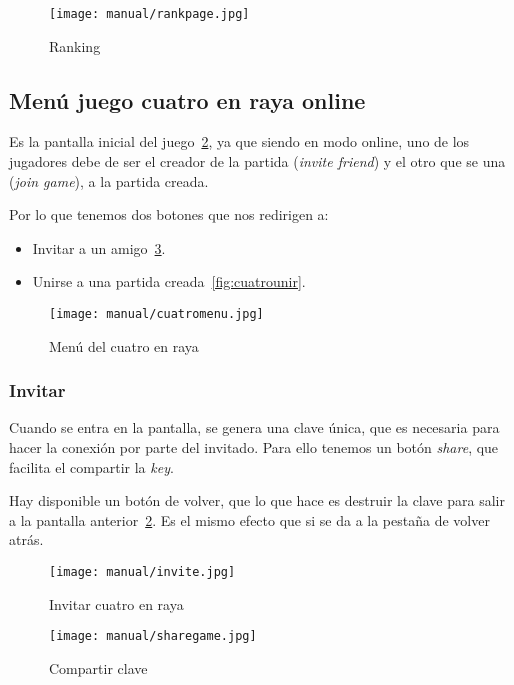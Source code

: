 \begin{figure}[H]
	\centering
	\texttt{[image: manual/rankpage.jpg]}
	\caption{Ranking}\label{fig:rankpage}
\end{figure}

\subsection{Menú juego cuatro en raya online}\label{cuatromenu}
Es la pantalla inicial del juego~\ref{fig:cuatromenu}, ya que siendo en modo online, uno de los jugadores debe de ser el creador de la  partida (\emph{invite friend}) y el otro que se una (\emph{join game}), a la partida creada.

Por lo que tenemos dos botones que nos redirigen a:
\begin{itemize}
	\item Invitar a un amigo~\ref{fig:cuatroinvitar}.
	\item Unirse a una partida creada~\ref{fig:cuatrounir}.
\end{itemize}

\begin{figure}[H]
	\centering
	\texttt{[image: manual/cuatromenu.jpg]}
	\caption{Menú del cuatro en raya}\label{fig:cuatromenu}
\end{figure}

\subsubsection{Invitar}\label{cuatroinvitar}
Cuando se entra en la pantalla, se genera una clave única, que es necesaria para hacer la conexión por parte del invitado. Para ello tenemos un botón \emph{share}, que facilita el compartir la \emph{key}.

Hay disponible un botón de volver, que lo que hace es destruir la clave para salir a la pantalla anterior~\ref{fig:cuatromenu}. Es el mismo efecto que si se da a la pestaña de volver atrás.


\begin{figure}[H]
	\centering
	\texttt{[image: manual/invite.jpg]}
	\caption{Invitar cuatro en raya}\label{fig:cuatroinvitar}
\end{figure}

\begin{figure}[H]
	\centering
	\texttt{[image: manual/sharegame.jpg]}
	\caption{Compartir clave}\label{fig:sharegame}
\end{figure}

